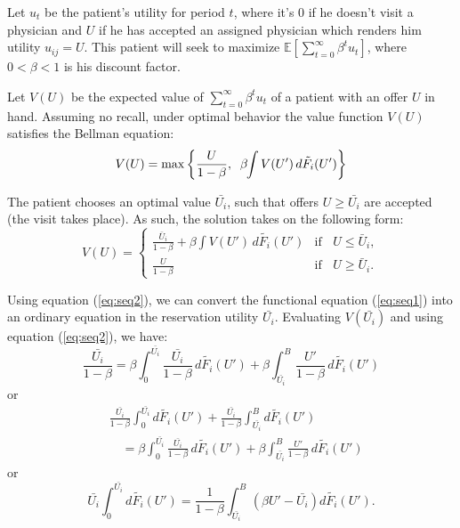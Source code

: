 \documentclass[../main.tex]{subfiles}
\begin{document}
Let $u_t$ be the patient's utility for period $t$, where it's $0$ if he doesn't visit a physician and $U$ if he has accepted an assigned physician which renders him utility $u_{ij} = U$. This patient will seek to maximize $\mathbb{E}[\sum_{t=0}^{\infty} \beta^t u_t]$, where $0 < \beta < 1$ is his discount factor.

Let $V(U)$ be the expected value of $\sum_{t=0}^{\infty} \beta^t u_t$ of a patient with an offer $U$ in hand. Assuming no recall, under optimal behavior the value function $V(U)$ satisfies the Bellman equation:
\begin{equation}
    V(U) = \max \left\{ \frac{U}{1 - \beta},\; \;\beta \hspace{-0.1cm}\int V(U') \, d \tilde{F_i}(U') \right\}
    \label{eq:seq1} 
\end{equation}

The patient chooses an optimal value $\bar{U_i}$, such that offers $U \geq \bar{U_i}$ are accepted (the visit takes place). As such, the solution takes on the following form:
\begin{equation}
    V(U) = \begin{cases}
        \frac{\bar{U}_i}{1 - \beta} + \beta \int V(U') \, d \tilde{F_i}(U') & \text{if }\; \; U \leq \bar{U}_i, \\[0.5em]
        \frac{U}{1 - \beta} & \text{if } \; \; U \geq \bar{U}_i.
    \end{cases}
\label{eq:seq2} 
\end{equation}

Using equation (\ref{eq:seq2}), we can convert the functional equation (\ref{eq:seq1}) into an ordinary equation in the reservation utility $\bar{U_i}$. Evaluating $V(\bar{U_i})$ and using equation (\ref{eq:seq2}), we have:
$$
\frac{\bar{U_i}}{1-\beta}= \beta \int_0^{\bar{U_i}} \frac{\bar{U_i}}{1-\beta} \, d \tilde{F_i}(U') + \beta \int_{\bar{U_i}}^B \frac{U'}{1-\beta} \, d \tilde{F_i}(U')
$$
or
$$
\begin{aligned}
& \frac{\bar{U_i}}{1-\beta} \int_0^{\bar{U_i}} d \tilde{F_i}(U') + \frac{\bar{U_i}}{1-\beta} \int_{\bar{U_i}}^B d \tilde{F_i}(U') \\
& \quad = \beta \int_0^{\bar{U_i}} \frac{\bar{U_i}}{1-\beta} \, d \tilde{F_i}(U') + \beta \int_{\bar{U_i}}^B \frac{U'}{1-\beta} \, d \tilde{F_i}(U')
\end{aligned}
$$
or
$$
\bar{U_i} \int_0^{\bar{U_i}} d \tilde{F_i}(U') = \frac{1}{1-\beta} \int_{\bar{U_i}}^B \left(\beta U' - \bar{U_i}\right) d \tilde{F_i}(U') .
$$
\end{document}
